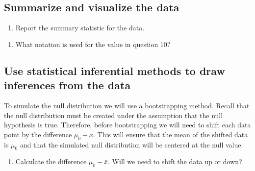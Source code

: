 \documentclass[
]{report}
\providecommand{\tightlist}{%
  \setlength{\itemsep}{0pt}\setlength{\parskip}{0pt}}
\begin{document}
\vspace{1in}

\hypertarget{summarize-and-visualize-the-data}{%
\subsection*{Summarize and visualize the data}\label{summarize-and-visualize-the-data}}

\begin{enumerate}
\def\labelenumi{\arabic{enumi}.}
\setcounter{enumi}{9}
\tightlist
\item
  Report the summary statistic for the data.
\end{enumerate}

\vspace{0.3in}

\begin{enumerate}
\def\labelenumi{\arabic{enumi}.}
\setcounter{enumi}{10}
\tightlist
\item
  What notation is used for the value in question 10?
\end{enumerate}

\vspace{0.3in}

\hypertarget{use-statistical-inferential-methods-to-draw-inferences-from-the-data}{%
\subsection*{Use statistical inferential methods to draw inferences from the data}\label{use-statistical-inferential-methods-to-draw-inferences-from-the-data}}

To simulate the null distribution we will use a bootstrapping method. Recall that the null distribution must be created under the assumption that the null hypothesis is true. Therefore, before bootstrapping we will need to shift each data point by the difference \(\mu_0 - \bar{x}\). This will ensure that the mean of the shifted data is \(\mu_0\) and that the simulated null distribution will be centered at the null value.

\begin{enumerate}
\def\labelenumi{\arabic{enumi}.}
\setcounter{enumi}{11}
\tightlist
\item
  Calculate the difference \(\mu_0 - \bar{x}\). Will we need to shift the data up or down?
\end{enumerate}
\end{document}

